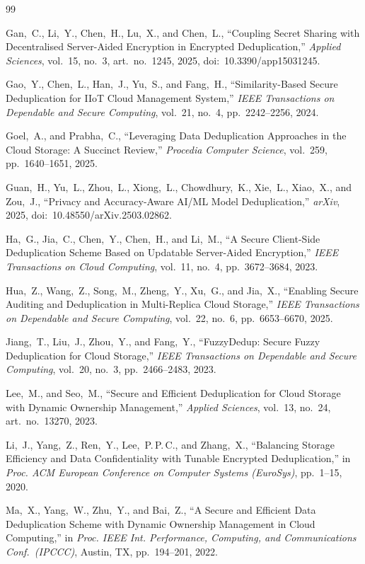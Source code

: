 \documentclass[12pt,a4paper,oneside]{report}
\begin{document}
\begin{thebibliography}{99}

Gan,~C., Li,~Y., Chen,~H., Lu,~X., and Chen,~L.,
``Coupling Secret Sharing with Decentralised Server-Aided Encryption in Encrypted Deduplication,''
\textit{Applied Sciences}, vol.~15, no.~3, art.~no.~1245, 2025,
doi:~10.3390/app15031245.

Gao,~Y., Chen,~L., Han,~J., Yu,~S., and Fang,~H.,
``Similarity-Based Secure Deduplication for IIoT Cloud Management System,''
\textit{IEEE Transactions on Dependable and Secure Computing},
vol.~21, no.~4, pp.~2242--2256, 2024.

Goel,~A., and Prabha,~C.,
``Leveraging Data Deduplication Approaches in the Cloud Storage: A Succinct Review,''
\textit{Procedia Computer Science}, vol.~259, pp.~1640--1651, 2025.

Guan,~H., Yu,~L., Zhou,~L., Xiong,~L., Chowdhury,~K., Xie,~L., Xiao,~X., and Zou,~J.,
``Privacy and Accuracy-Aware AI/ML Model Deduplication,''
\textit{arXiv}, 2025, doi:~10.48550/arXiv.2503.02862.

Ha,~G., Jia,~C., Chen,~Y., Chen,~H., and Li,~M.,
``A Secure Client-Side Deduplication Scheme Based on Updatable Server-Aided Encryption,''
\textit{IEEE Transactions on Cloud Computing},
vol.~11, no.~4, pp.~3672--3684, 2023.

Hua,~Z., Wang,~Z., Song,~M., Zheng,~Y., Xu,~G., and Jia,~X.,
``Enabling Secure Auditing and Deduplication in Multi-Replica Cloud Storage,''
\textit{IEEE Transactions on Dependable and Secure Computing},
vol.~22, no.~6, pp.~6653--6670, 2025.

Jiang,~T., Liu,~J., Zhou,~Y., and Fang,~Y.,
``FuzzyDedup: Secure Fuzzy Deduplication for Cloud Storage,''
\textit{IEEE Transactions on Dependable and Secure Computing},
vol.~20, no.~3, pp.~2466--2483, 2023.

Lee,~M., and Seo,~M.,
``Secure and Efficient Deduplication for Cloud Storage with Dynamic Ownership Management,''
\textit{Applied Sciences}, vol.~13, no.~24, art.~no.~13270, 2023.

Li,~J., Yang,~Z., Ren,~Y., Lee,~P.\,P.\,C., and Zhang,~X.,
``Balancing Storage Efficiency and Data Confidentiality with Tunable Encrypted Deduplication,''
in \textit{Proc. ACM European Conference on Computer Systems (EuroSys)}, pp.~1--15, 2020.

Ma,~X., Yang,~W., Zhu,~Y., and Bai,~Z.,
``A Secure and Efficient Data Deduplication Scheme with Dynamic Ownership Management in Cloud Computing,''
in \textit{Proc. IEEE Int. Performance, Computing, and Communications Conf.\ (IPCCC)},
Austin, TX, pp.~194--201, 2022.


\end{thebibliography}
\end{document}
